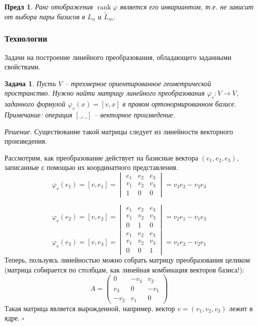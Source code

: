 \documentclass[a4paper,12pt]{article}
\DeclareMathOperator{\rank}{\mathop{rank}}
\newtheorem{propos}{Предл}[section]
\newtheorem*{prob}{Задача}
\newenvironment{soln}{\noindent\textit{Решение.}}{\hfill$\square$}
\begin{document}
\begin{propos}
	Ранг отображения $\rank \varphi$ является его инвариантом, т.е. не зависит от выбора пары базисов в $L_n$ и $\tilde{L}_m$.
\end{propos}

\subsubsection{Технологии}
Задачи на построение линейного преобразования, обладающего заданными свойствами. 

\begin{prob}
	Пусть $V$ -- трехмерное ориентированное геометрической пространство. Нужно найти матрицу линейного преобразования $\varphi_v : V \to V$, заданного формулой $\varphi_v(x) = [v, x]$ в правом ортонормированном базисе. Примечание: операция $[\_,\_]$ -- векторное произведение.
\end{prob}
\begin{soln}
	Существование такой матрицы следует из линейности векторного произведения. 
	
	Рассмотрим, как преобразование действует на базисные вектора $(e_1, e_2, e_3)$, записанные с помощью их координатного представления.
	\[
		\varphi_v(e_1) = [v, e_1] = 		
		\begin{vmatrix}
			e_1 & e_2 & e_3 \\
			v_1 & v_2 & v_3 \\
			1 & 0 & 0
		\end{vmatrix} = v_3 e_2 - v_2 e_3
	\]
	
	\[
	\varphi_v(e_2) = [v, e_2] = 		
		\begin{vmatrix}
			e_1 & e_2 & e_3 \\
			v_1 & v_2 & v_3 \\
			0 & 1 & 0
		\end{vmatrix} = v_2 e_1 - v_1 e_3
	\]
	\[
	\varphi_v(e_3) = [v, e_3] = 		
		\begin{vmatrix}
			e_1 & e_2 & e_3 \\
			v_1 & v_2 & v_3 \\
			0 & 0 & 1
		\end{vmatrix} = v_1 e_2 - v_2 e_1
	\]
Теперь, пользуясь линейностью можно собрать матрицу преобразования целиком (матрица собирается по столбцам, как линейная комбинация векторов базиса!):
\[
	A = \begin{pmatrix}
		0 & -v_3 & v_2 \\
		v_3 & 0 & -v_1 \\
		-v_2 & v_1 & 0
	\end{pmatrix}
\]
Такая матрица является вырожденной, например, вектор $v = (v_1, v_2, v_3)$ лежит в ядре.
\end{soln}
\end{document}

